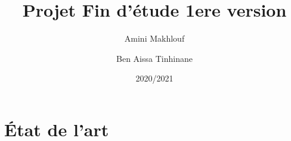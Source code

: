 \documentclass[11pt]{report}
\title{Projet Fin d'étude 1ere version}
\author{Amini Makhlouf \and Ben Aissa Tinhinane}
\date{2020/2021}
\begin{document}
    \maketitle
    \tableofcontents
    \listoffigures
    
    \part{État de l'art}
    
    
    
    
    
	
	
\end{document}
